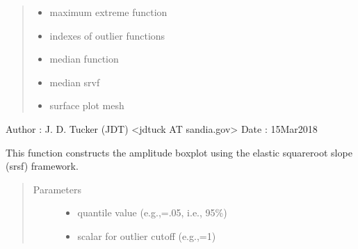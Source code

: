 \documentclass[letterpaper,10pt,english]{sphinxmanual}
\begin{document}
\begin{fulllineitems}
\begin{quote}
\begin{description}
\begin{itemize}
\item {} 
 \textendash{} maximum extreme function

\item {} 
 \textendash{} indexes of outlier functions

\item {} 
 \textendash{} median function

\item {} 
 \textendash{} median srvf

\item {} 
 \textendash{} surface plot mesh

\end{itemize}

\end{description}\end{quote}

Author :  J. D. Tucker (JDT) \textless{}jdtuck AT sandia.gov\textgreater{}
Date   :  15\sphinxhyphen{}Mar\sphinxhyphen{}2018

\begin{fulllineitems}
\label{\detokenize{boxplots:boxplots.ampbox.construct_boxplot}}
This function constructs the amplitude boxplot using the elastic
square\sphinxhyphen{}root slope (srsf) framework.
\begin{quote}\begin{description}
\item[{Parameters}] \leavevmode\begin{itemize}
\item {} 
 \textendash{} quantile value (e.g.,=.05, i.e., 95\%)

\item {} 
 \textendash{} scalar for outlier cutoff (e.g.,=1)

\end{itemize}

\end{description}\end{quote}

\end{fulllineitems}


\end{fulllineitems}
\end{document}
